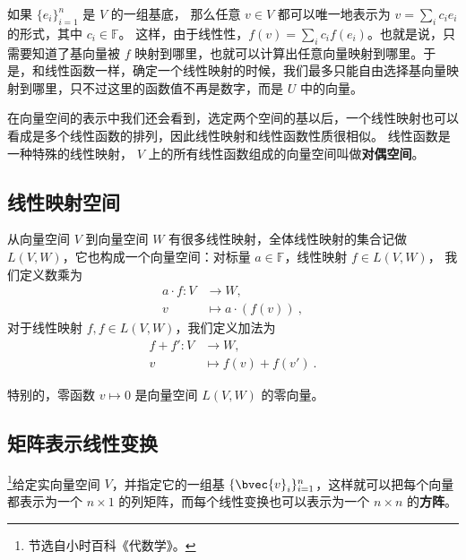 如果 $\{{e}_i\}_{i=1}^n$ 是 $V$ 的一组基底， 那么任意 $v\in V$ 都可以唯一地表示为 $v=\sum_i c_i {e}_i$ 的形式，其中 $c_i\in\mathbb{F}$。 这样，由于线性性，$f(v)=\sum_ic_if({e}_i)$。也就是说，只需要知道了基向量被 $f$ 映射到哪里，也就可以计算出任意向量映射到哪里。于是，和线性函数一样，确定一个线性映射的时候，我们最多只能自由选择基向量映射到哪里，只不过这里的函数值不再是数字，而是 $U$ 中的向量。

在向量空间的表示中我们还会看到，选定两个空间的基以后，一个线性映射也可以看成是多个线性函数的排列，因此线性映射和线性函数性质很相似。 线性函数是一种特殊的线性映射， $V$ 上的所有线性函数组成的向量空间叫做\textbf{对偶空间}。

\subsection{线性映射空间}\label{sub_LinMap_1}
从向量空间 $V$ 到向量空间 $W$ 有很多线性映射，全体线性映射的集合记做 $L(V, W)$，它也构成一个向量空间：对标量 $a \in \mathbb{F}$，线性映射 $f \in L(V, W)$， 我们定义数乘为
\begin{equation}
\begin{aligned}
a \cdot f: V &\to W, \\
v &\mapsto a \cdot (f(v))~,
\end{aligned}
\end{equation}
对于线性映射 $f, f \in L(V, W)$，我们定义加法为
\begin{equation}
\begin{aligned}
f + f': V &\to W, \\
v &\mapsto f(v) + f(v')~.
\end{aligned}
\end{equation}

特别的，零函数 $v \mapsto 0$ 是向量空间 $L(V, W)$ 的零向量。


\subsection{矩阵表示线性变换}


\footnote{节选自小时百科《代数学》。}给定实向量空间 $V$，并指定它的一组基 $\{\bvec{v}_i\}_{i=1}^n$，这样就可以把每个向量都表示为一个 $n\times 1$ 的列矩阵，而每个线性变换也可以表示为一个 $n\times n$ 的\textbf{方阵}。


